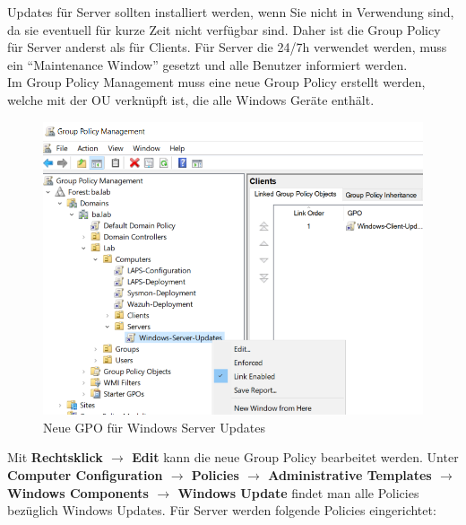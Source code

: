Updates für Server sollten installiert werden, wenn Sie nicht in Verwendung sind, da sie eventuell für kurze Zeit nicht verfügbar sind.
Daher ist die Group Policy für Server anderst als für Clients.
Für Server die 24/7h verwendet werden, muss ein ``Maintenance Window'' gesetzt und alle Benutzer informiert werden.\\

Im Group Policy Management muss eine neue Group Policy erstellt werden, welche mit der OU verknüpft ist, die alle Windows Geräte enthält.
\begin{figure}[H]
    \centering
    \includegraphics[width=0.7\linewidth]{../img/Updates/edit-gpo-server.png}
    \caption{Neue GPO für Windows Server Updates}
\end{figure}

Mit \textbf{Rechtsklick $\rightarrow$ Edit} kann die neue Group Policy bearbeitet werden.
Unter \textbf{Computer Configuration $\rightarrow$ Policies $\rightarrow$ Administrative Templates $\rightarrow$ Windows Components $\rightarrow$ Windows Update} findet man alle Policies bezüglich Windows Updates.
Für Server werden folgende Policies eingerichtet:


